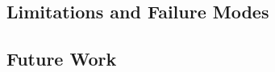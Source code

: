 \documentclass[10pt,twocolumn,letterpaper]{article}
\begin{document}

\subsection{Limitations and Failure Modes}




\subsection{Future Work}

\end{document}
